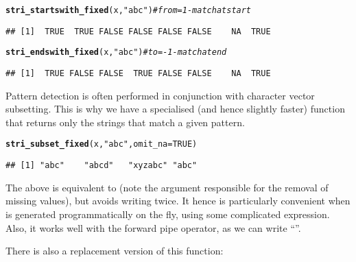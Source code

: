 \documentclass[nojss]{jss}\usepackage[]{graphicx}\usepackage[]{xcolor}
\makeatletter
\newcommand{\hlnum}[1]{\textcolor[rgb]{0.686,0.059,0.569}{#1}}%
\newcommand{\hlstr}[1]{\textcolor[rgb]{0.192,0.494,0.8}{#1}}%
\newcommand{\hlcom}[1]{\textcolor[rgb]{0.678,0.584,0.686}{\textit{#1}}}%
\newcommand{\hlstd}[1]{\textcolor[rgb]{0.345,0.345,0.345}{#1}}%
\newcommand{\hlkwc}[1]{\textcolor[rgb]{0.333,0.667,0.333}{#1}}%
\newcommand{\hlkwd}[1]{\textcolor[rgb]{0.737,0.353,0.396}{\textbf{#1}}}%
\newenvironment{kframe}{%
 \def\at@end@of@kframe{}%
 \ifinner\ifhmode%
  \def\at@end@of@kframe{\end{minipage}}%
  \begin{minipage}{\columnwidth}%
 \fi\fi%
 \def\FrameCommand##1{\hskip\@totalleftmargin \hskip-\fboxsep
 \colorbox{shadecolor}{##1}\hskip-\fboxsep
     \hskip-\linewidth \hskip-\@totalleftmargin \hskip\columnwidth}%
 \MakeFramed {\advance\hsize-\width
   \@totalleftmargin\z@ \linewidth\hsize
   \@setminipage}}%
 {\par\unskip\endMakeFramed%
 \at@end@of@kframe}
\newenvironment{knitrout}{}{} %
\makeatother
\begin{document}
\begin{knitrout}
\color{fgcolor}\begin{kframe}
\begin{alltt}
\hlkwd{stri_startswith_fixed}\hlstd{(x,} \hlstr{"abc"}\hlstd{)}  \hlcom{# from=1 - match at start}
\end{alltt}
\begin{verbatim}
## [1]  TRUE  TRUE FALSE FALSE FALSE FALSE    NA  TRUE
\end{verbatim}
\begin{alltt}
\hlkwd{stri_endswith_fixed}\hlstd{(x,} \hlstr{"abc"}\hlstd{)}    \hlcom{# to=-1 - match at end}
\end{alltt}
\begin{verbatim}
## [1]  TRUE FALSE FALSE  TRUE FALSE FALSE    NA  TRUE
\end{verbatim}
\end{kframe}
\end{knitrout}


\medskip
Pattern detection is often performed in conjunction
with character vector subsetting.
This is why we have a specialised (and hence slightly faster)
function that  returns only the strings that match a given pattern.


\begin{knitrout}
\color{fgcolor}\begin{kframe}
\begin{alltt}
\hlkwd{stri_subset_fixed}\hlstd{(x,} \hlstr{"abc"}\hlstd{,} \hlkwc{omit_na}\hlstd{=}\hlnum{TRUE}\hlstd{)}
\end{alltt}
\begin{verbatim}
## [1] "abc"    "abcd"   "xyzabc" "abc"
\end{verbatim}
\end{kframe}
\end{knitrout}

The above is equivalent to 
(note the argument responsible for the removal of missing values),
but avoids writing  twice.
It hence is particularly convenient when  is generated
programmatically on the fly, using some complicated expression.
Also, it works well with the forward pipe operator, as we can write
``''.




There is also a replacement version of this function:
\end{document}
